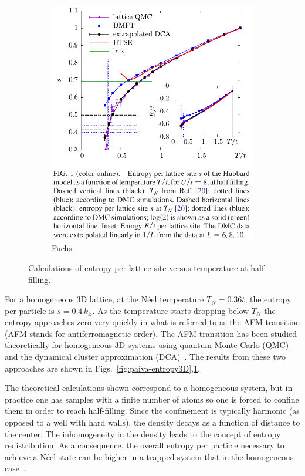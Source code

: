 \documentclass[11pt,letter]{article}
\newcommand{\kb}{\ensuremath{k_{\text{B}}}}
\begin{document}
\begin{figure}
\begin{subfigure}[b]{0.48\textwidth}
                \includegraphics[width=\textwidth]{figures/fuchs_entropy.png}
                \caption{Fuchs~\cite{Fuchs2011}}
                \label{fig:fuchs-entropy3D}
        \end{subfigure}%
        \caption{Calculations of entropy per lattice site versus temperature at half filling.}\label{fig:entropy-Fuchs-Paiva}
\end{figure}
For a homogeneous 3D lattice, at the N\'{e}el temperature $T_{N}=0.36t$, the
entropy per particle is $s=0.4\,\kb$.  As the temperature starts dropping below
$T_{N}$ the entropy approaches zero very quickly in what is referred to as the
AFM transition (AFM stands for antiferromagnetic order).  The AFM transition
has been studied theoretically for homogeneous 3D systems using  quantum
Monte Carlo (QMC)~\cite{Paiva2011} and the dynamical cluster approximation
(DCA)~\cite{Fuchs2011}.  The results from these two approaches are shown in
Figs.~\ref{fig:paiva-entropy3D},\ref{fig:fuchs-entropy3D}.

The theoretical calculations shown correspond to a homogeneous system, but in
practice  one has samples with a finite number of atoms so one is forced to
confine them in order to reach half-filling.   Since the confinement is
typically harmonic (as opposed to a well with hard walls), the density decays
as a function of distance to the center.   The inhomogeneity in the density
leads to the concept of entropy redistribution.  As a consequence, the overall
entropy per particle  necessary to achieve a N\'{e}el state can be higher in a
trapped system that in the homogeneous case~\cite{Paiva2011}. 
\end{document}
